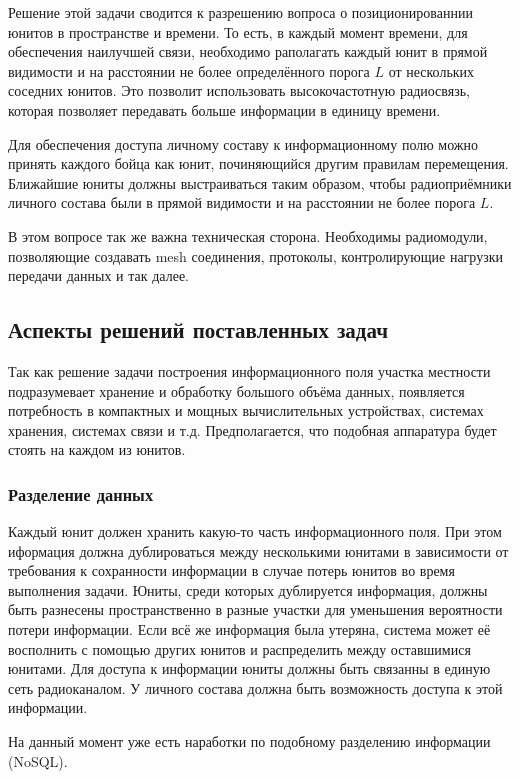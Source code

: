 Решение этой задачи сводится к разрешению вопроса о позиционированнии юнитов
в пространстве и времени. То есть, в каждый момент времени, для обеспечения 
наилучшей связи, необходимо раполагать каждый юнит в прямой видимости и 
на расстоянии не более определённого порога $L$ от нескольких соседних юнитов.
Это позволит использовать высокочастотную радиосвязь, которая позволяет
передавать больше информации в единицу времени.

Для обеспечения доступа личному составу к информационному полю можно принять
каждого бойца как юнит, починяющийся другим правилам перемещения. Ближайшие
юниты должны выстраиваться таким образом, чтобы радиоприёмники личного состава
были в прямой видимости и на расстоянии не более порога $L$.

В этом вопросе так же важна техническая сторона. Необходимы радиомодули,
позволяющие создавать mesh соединения, протоколы, контролирующие нагрузки
передачи данных и так далее.

\subsection{Аспекты решений поставленных задач} 

Так как решение задачи построения информационного поля
участка местности подразумевает хранение и обработку большого объёма
данных, появляется потребность в компактных и мощных вычислительных
устройствах, системах хранения, системах связи и т.д. 
Предполагается, что подобная аппаратура будет
стоять на каждом из юнитов.

\subsubsection{Разделение данных}

Каждый юнит должен хранить какую-то часть информационного поля.
При этом иформация должна дублироваться между несколькими юнитами в
зависимости от требования к сохранности информации в случае потерь
юнитов во время выполнения задачи. Юниты, среди которых дублируется
информация, должны быть разнесены пространственно в разные участки
для уменьшения вероятности потери информации. Если всё же информация
была утеряна, система может её восполнить с помощью других юнитов и 
распределить между оставшимися юнитами. Для доступа к информации юниты
должны быть связанны в единую сеть радиоканалом. У личного состава
должна быть возможность доступа к этой информации. 

На данный момент уже есть наработки по подобному разделению информации (NoSQL).

